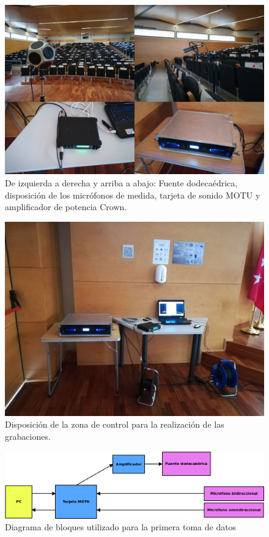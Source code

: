 \documentclass[11pt,a4paper,twoside]{book}
\begin{document}
	        \begin{figure}[H]
	            \includegraphics[scale=0.6]{../imagenes/equipos.jpg}
			    \centering
			    \caption{De izquierda a derecha y arriba a abajo: Fuente dodecaédrica, disposición de los micrófonos de medida, tarjeta de sonido MOTU y amplificador de potencia Crown.}
			    \label{fig:equipos}
	        \end{figure}
	    
	        \begin{figure}[H]
	            \includegraphics[scale=0.4]{../imagenes/control.jpg}
			    \centering
			    \caption{Disposición de la zona de control para la realización de las grabaciones.}
			    \label{fig:control}
	        \end{figure}
	        
	        \begin{figure}[H]
	            \includegraphics[scale=0.5]{../imagenes/diagrama_bloques1.png}
			    \centering
			    \caption{Diagrama de bloques utilizado para la primera toma de datos}
			    \label{fig:bloques1}
	        \end{figure}
	    
\end{document}
